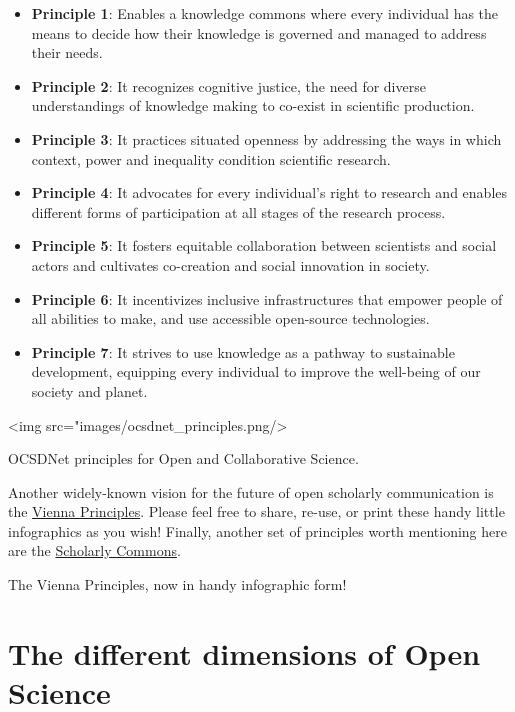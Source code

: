 \documentclass[]{book}
\begin{document}
\begin{itemize}
\item
  \textbf{Principle 1}: Enables a knowledge commons where every individual has the means to decide how their knowledge is governed and managed to address their needs.
\item
  \textbf{Principle 2}: It recognizes cognitive justice, the need for diverse understandings of knowledge making to co-exist in scientific production.
\item
  \textbf{Principle 3}: It practices situated openness by addressing the ways in which context, power and inequality condition scientific research.
\item
  \textbf{Principle 4}: It advocates for every individual's right to research and enables different forms of participation at all stages of the research process.
\item
  \textbf{Principle 5}: It fosters equitable collaboration between scientists and social actors and cultivates co-creation and social innovation in society.
\item
  \textbf{Principle 6}: It incentivizes inclusive infrastructures that empower people of all abilities to make, and use accessible open-source technologies.
\item
  \textbf{Principle 7}: It strives to use knowledge as a pathway to sustainable development, equipping every individual to improve the well-being of our society and planet.
\end{itemize}

\textless{}img src="images/ocsdnet\_principles.png/\textgreater{}

OCSDNet principles for Open and Collaborative Science.

Another widely-known vision for the future of open scholarly communication is the \href{https://viennaprinciples.org/}{Vienna Principles}. Please feel free to share, re-use, or print these handy little infographics as you wish! Finally, another set of principles worth mentioning here are the \href{https://osf.io/6c2xt/}{Scholarly Commons}.

The Vienna Principles, now in handy infographic form!

\hypertarget{the-different-dimensions-of-open-science}{%
\section{The different dimensions of Open Science }\label{the-different-dimensions-of-open-science}}
\end{document}
